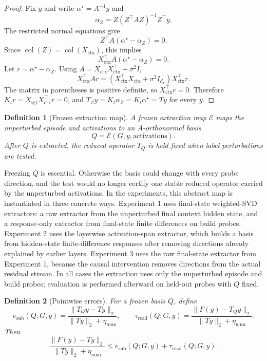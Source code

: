 \documentclass[11pt]{article}
\newtheorem{definition}{Definition}
\begin{document}
\begin{proof}
Fix \(y\) and write \(\alpha^\star=A^{-1}y\) and
\[
\alpha_Z=Z(Z^\top AZ)^{-1}Z^\top y.
\]
The restricted normal equations give
\[
Z^\top A(\alpha^\star-\alpha_Z)=0.
\]
Since \(\operatorname{col}(Z)=\operatorname{col}(X_{\mathrm{ctx}})\), this implies
\[
X_{\mathrm{ctx}}^\top A(\alpha^\star-\alpha_Z)=0.
\]
Let \(r=\alpha^\star-\alpha_Z\). Using \(A=X_{\mathrm{ctx}}X_{\mathrm{ctx}}^\top+\sigma^2 I\),
\[
X_{\mathrm{ctx}}^\top Ar
=
(X_{\mathrm{ctx}}^\top X_{\mathrm{ctx}}+\sigma^2 I_{d_x})X_{\mathrm{ctx}}^\top r.
\]
The matrix in parentheses is positive definite, so \(X_{\mathrm{ctx}}^\top r=0\). Therefore
\(K_tr=X_{\mathrm{tgt}}X_{\mathrm{ctx}}^\top r=0\), and \(T_Zy=K_t\alpha_Z=K_t\alpha^\star=Ty\) for
every \(y\).
\end{proof}

\begin{definition}[Frozen extraction map]
A frozen extraction map \(\mathcal{E}\) maps the unperturbed episode and activations to an
\(A\)-orthonormal basis
\[
Q=\mathcal{E}(G,y,\mathrm{activations}).
\]
After \(Q\) is extracted, the reduced operator \(T_Q\) is held fixed when label perturbations are
tested.
\end{definition}

Freezing \(Q\) is essential. Otherwise the basis could change with every probe direction, and the
test would no longer certify one stable reduced operator carried by the unperturbed activations.
In the experiments, this abstract map is instantiated in three concrete ways. Experiment 1 uses
final-state weighted-SVD extractors: a raw extractor from the unperturbed final context hidden
state, and a response-only extractor from final-state finite differences on build probes. Experiment
2 uses the layerwise activation-span extractor, which builds a basis from hidden-state
finite-difference responses after removing directions already explained by earlier layers. Experiment
3 uses the raw final-state extractor from Experiment 1, because the causal intervention removes
directions from the actual residual stream. In all cases the extraction uses only the unperturbed
episode and build probes; evaluation is performed afterward on held-out probes with \(Q\) fixed.

\begin{definition}[Pointwise errors]
For a frozen basis \(Q\), define
\[
e_{\mathrm{sub}}(Q;G,y)
=
\frac{\|T_Qy-Ty\|_2}{\|Ty\|_2+\eta_{\mathrm{num}}},
\qquad
\tau_{\mathrm{read}}(Q;G,y)
=
\frac{\|F(y)-T_Qy\|_2}{\|Ty\|_2+\eta_{\mathrm{num}}}.
\]
Then
\[
\frac{\|F(y)-Ty\|_2}{\|Ty\|_2+\eta_{\mathrm{num}}}
\le
e_{\mathrm{sub}}(Q;G,y)+\tau_{\mathrm{read}}(Q;G,y).
\]
\end{definition}
\end{document}
